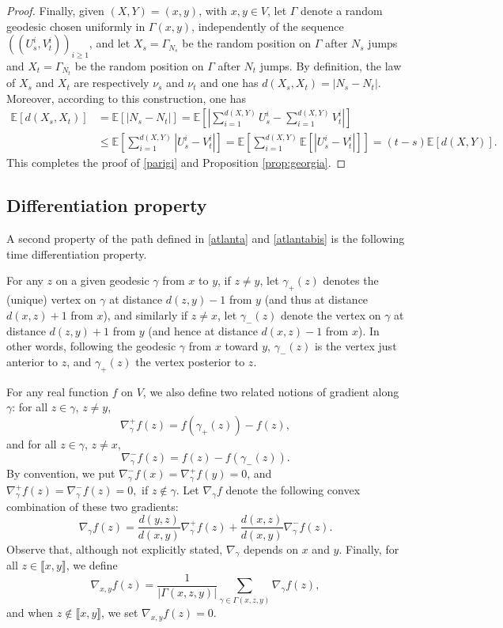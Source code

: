 \documentclass[11pt]{amsart}
\numberwithin{equation}{section}
\begin{document}
\begin{proof}
Finally,  given $(X,Y)=(x,y)$, with  $x,y\in V$, let $\Gamma$ denote a random geodesic chosen uniformly in $\Gamma(x,y)$, independently of the sequence $\left((U_s^i,V_t^i)\right)_{i\geq 1}$,
and  let $X_s= \Gamma_{N_s}$ be the random position on $\Gamma$ after $N_s$ jumps and  $X_t= \Gamma_{N_t}$ be the random position on $\Gamma$ after $N_t$ jumps. By definition, the law of $X_s$ and $X_t$ are respectively $\nu_s$ and $\nu_t$ and one has  $d(X_s,X_t)= |N_s-N_t|$.
Moreover, according to this construction, one has 
\begin{align*}
{\mathbb{E}}[ d(X_s,X_t)]&={\mathbb{E}}\left[|N_s-N_t| \right]
= {\mathbb{E}}\left[\left|\sum_{i=1}^{d(X,Y)} U_s^i-\sum_{i=1}^{d(X,Y)} V_t^i\right|\right]\\
&\leq {\mathbb{E}}\left[\sum_{i=1}^{d(X,Y)} \left|U_s^i-V_t^i\right|\right]
= {\mathbb{E}}\left[\sum_{i=1}^{d(X,Y)} {\mathbb{E}}\left[\left|U_s^i-V_t^i\right|\right]\right]
= (t-s) {\mathbb{E}}[d(X,Y)].
\end{align*}
This completes the proof of \eqref{parigi} and Proposition \ref{prop:georgia}.
\end{proof}

\subsection{Differentiation property} \label{sec:differentiation}

A second property of the path defined in \eqref{atlanta} and \eqref{atlantabis} is the following time differentiation  property. 

For any $z$ on a given geodesic $\gamma$ from
 $x$ to $y$, if $z\neq y$, let $\gamma_+(z)$ denotes the (unique) vertex on $\gamma$ at distance $d(z,y)-1$ from $y$ (and thus at distance $d(x,z)+1$ from $x$), and similarly if $z\neq x$,
  let $\gamma_-(z)$ denote the vertex on $\gamma$ at distance $d(z,y)+1$ from $y$ (and hence at distance $d(x,z)-1$ from $x$).
  In other words, following the geodesic $\gamma$ from $x$ toward $y$, $\gamma_-(z)$ is the vertex just anterior to $z$, and $\gamma_+(z)$ the vertex posterior to $z$.
  
 For any real function $f$ on $V$,  we also define  two related notions of gradient along $\gamma$: for all $z\in \gamma$, $z\neq y$,
 $$
 \nabla_\gamma^+f(z)= f(\gamma_+(z))-f(z),
 $$ 
 and for all $z\in \gamma$, $z\neq x$,
 $$
 \nabla_\gamma^-f(z)= f(z)-f(\gamma_-(z)).
 $$
 By convention, we put $\nabla^-_\gamma f(x)=\nabla_\gamma^+f(y)=0$, and $\nabla_\gamma^+f(z)=\nabla^-_\gamma f(z)=0,$ if $z\notin \gamma.$
 Let $\nabla_\gamma f$ denote the following convex combination of these two gradients:
 $$
 \nabla_\gamma f(z)= \frac{d(y,z)}{d(x,y)} \nabla_\gamma^+f(z) + \frac{d(x,z)}{d(x,y)} \nabla_\gamma^-f(z) .
 $$
 Observe that, although not explicitly stated, $\nabla_\gamma $ depends on $x$ and $y$.
 Finally, for all $z\in \llbracket x,y\rrbracket $, we define
 $$
 \nabla_{x,y}f (z) = \frac{1}{|\Gamma(x,z,y)| }\sum_{\gamma\in\Gamma(x,z,y)}  \nabla_\gamma f(z),
 $$
 and when $z\notin \llbracket x,y\rrbracket$, we set $\nabla_{x,y}f(z)=0.$
 
\end{document}
